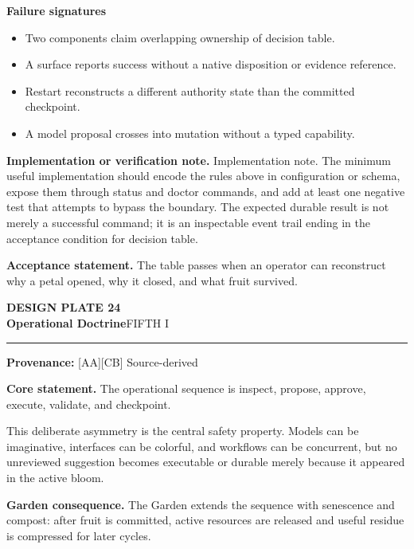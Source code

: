 \documentclass[10pt,letterpaper,oneside]{article}
\newcommand{\prov}[1]{\textcolor{gardenBlue}{\sffamily\footnotesize\textbf{Provenance:} #1}}
\newcommand{\platetitle}[3]{%
  \begin{minipage}[t][0.54in][t]{\textwidth}
  {\sffamily\bfseries\color{gardenDeep}\fontsize{9}{10}\selectfont DESIGN PLATE #1}\\[-1pt]
  {\sffamily\bfseries\color{gardenInk}\fontsize{16.5}{18}\selectfont #2}\hfill{\sffamily\color{gardenGreen}\large #3}
  \end{minipage}\vspace{-2pt}\hrule\vspace{5pt}}
\begin{document}
\textbf{Failure signatures}
\begin{itemize}
\item Two components claim overlapping ownership of decision table.
\item A surface reports success without a native disposition or evidence reference.
\item Restart reconstructs a different authority state than the committed checkpoint.
\item A model proposal crosses into mutation without a typed capability.
\end{itemize}
\textbf{Implementation or verification note.} Implementation note. The minimum useful implementation should encode the rules above in configuration or schema, expose them through status and doctor commands, and add at least one negative test that attempts to bypass the boundary. The expected durable result is not merely a successful command; it is an inspectable event trail ending in the acceptance condition for decision table.

\begin{acceptbox}
\textbf{Acceptance statement.} The table passes when an operator can reconstruct why a petal opened, why it closed, and what fruit survived.
\end{acceptbox}
\newpage
\platetitle{24}{Operational Doctrine}{FIFTH I}
\prov{[AA][CB] Source-derived}
\fontsize{8.85}{10.45}\selectfont
\begin{corebox}
\textbf{Core statement.} The operational sequence is inspect, propose, approve, execute, validate, and checkpoint.
\end{corebox}
This deliberate asymmetry is the central safety property. Models can be imaginative, interfaces can be colorful, and workflows can be concurrent, but no unreviewed suggestion becomes executable or durable merely because it appeared in the active bloom.

\textbf{Garden consequence.} The Garden extends the sequence with senescence and compost: after fruit is committed, active resources are released and useful residue is compressed for later cycles.
\end{document}
